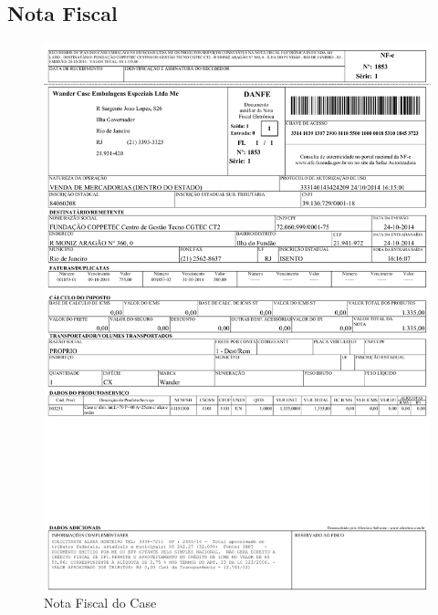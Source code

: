 \subsection{Nota Fiscal}
\begin{figure}[H]
 \centering
 \includegraphics[width=1\columnwidth]{Wandercase/nota_wander.pdf}
 \caption{Nota Fiscal do Case}
 \end{figure} 